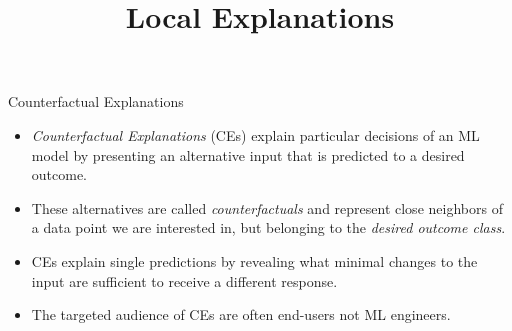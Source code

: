 \documentclass[11pt,compress,t,notes=noshow, xcolor=table]{beamer}
\title{Local Explanations}
\institute{\href{https://compstat-lmu.github.io/lecture_i2ml/}{compstat-lmu.github.io/lecture\_i2ml}}
\date{}
\begin{document}
	









\begin{vbframe}{Counterfactual Explanations}
	\begin{itemize}
	    \item \emph{Counterfactual Explanations} (CEs) explain particular decisions of an ML model by presenting an alternative input that is predicted to a desired outcome.
		\item These alternatives are called \emph{counterfactuals} and represent close neighbors of a data point we are interested in, but belonging to the \emph{desired outcome class}. 
		\item CEs explain single predictions by revealing what minimal changes to the input are sufficient to receive a different response.
		\item The targeted audience of CEs are often end-users not ML engineers.
	\end{itemize}
\end{vbframe}
\end{document}
